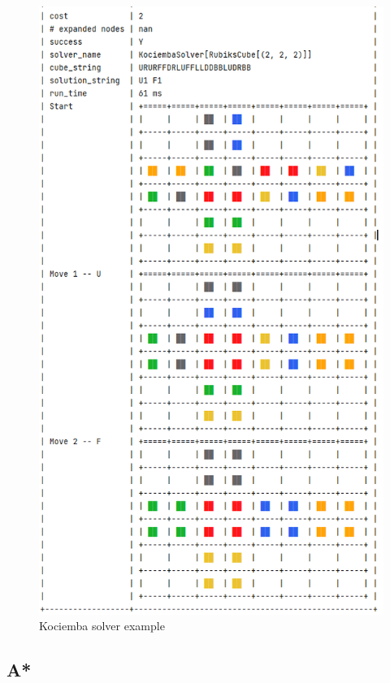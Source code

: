 \begin{figure}[H]
\centering
\includegraphics[scale=0.55]{./Figures/examplekociemba}
\caption[Examples]{Kociemba solver example}
\label{fig:examplekociemba}
\end{figure}



\subsection{A*}
\label{ASSS}


